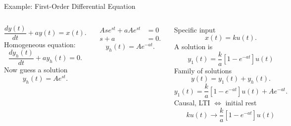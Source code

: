 \begin{frame}{Example: First-Order Differential Equation}




       \begin{columns}
            \begin{equation*}
                \frac{dy(t)}{dt} + ay(t) = x(t).
            \end{equation*}
            \pause
            Homogeneous equation:
            \begin{equation*}
                \frac{dy_h(t)}{dt} + ay_h(t) = 0.
            \end{equation*}
            Now guess a solution
            \begin{equation*}
                y_h(t) = Ae^{st}.
            \end{equation*}

            {
                \begin{align*}
                    Ase^{st} + aAe^{st} &= 0\\
                    s+a & = 0.
                \end{align*}
                \pause
                \begin{equation*}
                    y_h(t) = Ae^{-at}.
                \end{equation*}

            }
            \pause
            {
                Specific input
                \begin{equation*}
                    x(t) = ku(t).
                \end{equation*}
                A solution is
                \begin{equation*}
                    y_1(t) = \frac{k}{a}\left[1-e^{-at}\right]u(t)
                \end{equation*}
                Family of solutions
                \begin{equation*}
                    y(t) = y_1(t) + y_h(t).
                \end{equation*}
                \begin{equation*}
                    y_1(t) = \frac{k}{a}\left[1-e^{-at}\right]u(t) +  Ae^{-at}.
                \end{equation*}
                Causal, LTI $\Longleftrightarrow$ initial rest
                \begin{equation*}
                    ku(t) \rightarrow \frac{k}{a}\left[1-e^{-at}\right]u(t)
                \end{equation*}

            }
        \end{columns}
\end{frame}

